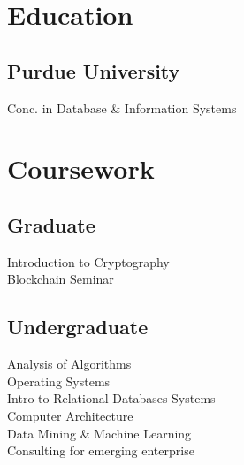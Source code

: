 \documentclass[]{resume_openfont}
\begin{document}
%
%
\lastupdated

%
%



%
%

\begin{minipage}[t]{0.33\textwidth} 


\section{Education} 

\subsection{Purdue University}
Conc. in Database \& Information Systems
\sectionsep


\sectionsep


\section{Coursework}
\subsection{Graduate}
Introduction to Cryptography \\
Blockchain Seminar \\
\sectionsep



\subsection{Undergraduate}
Analysis of Algorithms \\
Operating Systems \\
Intro to Relational Databases Systems \\
Computer Architecture \\
Data Mining \& Machine Learning \\
Consulting for emerging enterprise \\
\sectionsep


\end{minipage}
\end{document}
